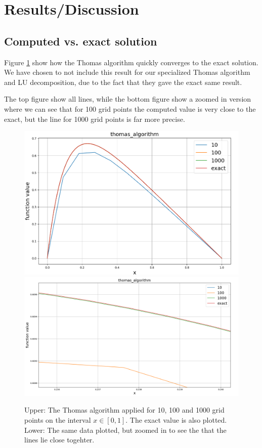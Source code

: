 \documentclass{emulateapj}
\begin{document}
\section{Results/Discussion}
\subsection{Computed vs. exact solution}

Figure \ref{fig:thomas_data} show how the Thomas algorithm quickly converges to the exact solution. We have chosen to not include this result for our specialized Thomas algorithm and LU decomposition, due to the fact that they gave the exact same result.

The top figure show all lines, while the bottom figure show a zoomed in version where we can see that for 100 grid points the computed value is very close to the exact, but the line for 1000 grid points is far more precise.

\begin{figure}[h]
    \centering
    \includegraphics[scale=0.5]{thomas_data.png}
    \includegraphics[scale=0.5]{thomas_data_zoom.png}
    \caption{Upper: The Thomas algorithm applied for 10, 100 and 1000 grid points on the interval $x \in [0, 1]$. The exact value is also plotted. Lower: The same data plotted, but zoomed in to see the that the lines lie close togehter.}
    \label{fig:thomas_data}
\end{figure}
\end{document}
